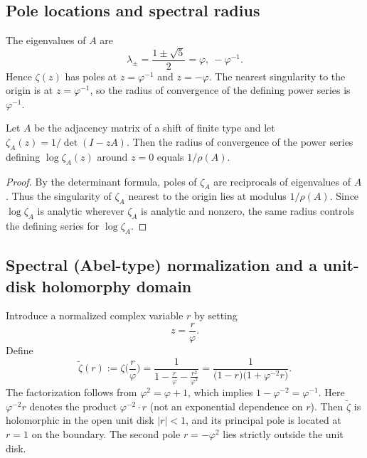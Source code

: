 \subsection{Pole locations and spectral radius}
The eigenvalues of $A$ are
\[
\lambda_\pm=\frac{1\pm \sqrt{5}}{2}=\varphi,\ -\varphi^{-1}.
\]
Hence $\zeta(z)$ has poles at $z=\varphi^{-1}$ and $z=-\varphi$.
The nearest singularity to the origin is at $z=\varphi^{-1}$, so the radius of convergence of the defining power series is $\varphi^{-1}$.

\begin{proposition}
\label{prop:radius_inverse_spectral}
Let $A$ be the adjacency matrix of a shift of finite type and let $\zeta_A(z)=1/\det(I-zA)$.
Then the radius of convergence of the power series defining $\log\zeta_A(z)$ around $z=0$ equals $1/\rho(A)$.
\end{proposition}

\begin{proof}
By the determinant formula, poles of $\zeta_A$ are reciprocals of eigenvalues of $A$.
Thus the singularity of $\zeta_A$ nearest to the origin lies at modulus $1/\rho(A)$.
Since $\log\zeta_A$ is analytic wherever $\zeta_A$ is analytic and nonzero, the same radius controls the defining series for $\log\zeta_A$.
\end{proof}

\subsection{Spectral (Abel-type) normalization and a unit-disk holomorphy domain}
Introduce a normalized complex variable $r$ by setting
\[
z=\frac{r}{\varphi}.
\]
Define
\[
\widetilde{\zeta}(r):=\zeta\Big(\frac{r}{\varphi}\Big)
=\frac{1}{1-\frac{r}{\varphi}-\frac{r^2}{\varphi^2}}
=\frac{1}{\bigl(1-r\bigr)\bigl(1+\varphi^{-2}r\bigr)}.
\]
The factorization follows from $\varphi^2=\varphi+1$, which implies $1-\varphi^{-2}=\varphi^{-1}$.
Here $\varphi^{-2}r$ denotes the product $\varphi^{-2}\cdot r$ (not an exponential dependence on $r$).
Then $\widetilde{\zeta}$ is holomorphic in the open unit disk $|r|<1$, and its principal pole is located at $r=1$ on the boundary.
The second pole $r=-\varphi^2$ lies strictly outside the unit disk.

